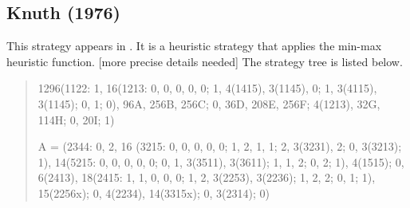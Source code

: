 \subsection{Knuth (1976)}

This strategy appears in \cite{knuth76}. It is a heuristic strategy that applies the min-max heuristic function. [more precise details needed] The strategy tree is listed below.


\begin{quote}
{ \small
1296(1122: 1, 16(1213: 0, 0, 0, 0, 0; 1, 4(1415), 3(1145), 0; 1, 3(4115), 3(1145); 0, 1; 0), 96A, 256B, 256C; 0, 36D, 208E, 256F; 4(1213), 32G, 114H; 0, 20I; 1)

A = (2344: 0, 2, 16 (3215: 0, 0, 0, 0, 0; 1, 2, 1, 1; 2, 3(3231), 2; 0, 3(3213); 1), 
14(5215: 0, 0, 0, 0, 0; 0, 1, 3(3511), 3(3611); 1, 1, 2; 0, 2; 1), 4(1515); 0, 6(2413), 
18(2415: 1, 1, 0, 0, 0; 1, 2, 3(2253), 3(2236); 1, 2, 2; 0, 1; 1), 15(2256x); 0, 4(2234), 14(3315x); 0, 3(2314); 0) 
}
\end{quote}

